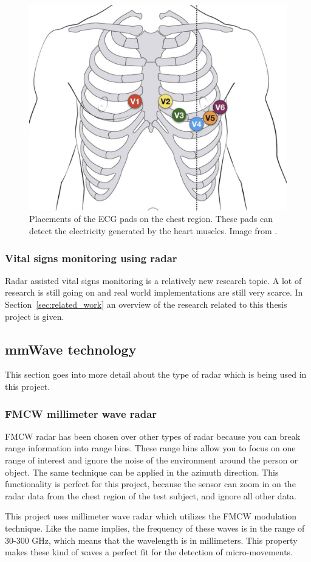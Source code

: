 \begin{figure}[t]
\centering
\includegraphics[width=.5\textwidth]{figures/background/ecg.png}
\caption{Placements of the ECG pads on the chest region. These pads can detect the electricity generated by the heart muscles. Image from \cite{ecg_lead_website}.}
\label{fig:ecg}
\end{figure}

\subsubsection{Vital signs monitoring using radar}
Radar assisted vital signs monitoring is a relatively new research topic. A lot of research is still going on and real world implementations are still very scarce. In Section~\ref{sec:related_work} an overview of the research related to this thesis project is given.  

\subsection{mmWave technology}
\label{sec:mmwave_tech}
This section goes into more detail about the type of radar which is being used in this project.

\subsubsection{FMCW millimeter wave radar}
FMCW radar has been chosen over other types of radar because you can break range information into range bins. These range bins allow you to focus on one range of interest and ignore the noise of the environment around the person or object. The same technique can be applied in the azimuth direction. This functionality is perfect for this project, because the sensor can zoom in on the radar data from the chest region of the test subject, and ignore all other data.

This project uses millimeter wave radar which utilizes the FMCW modulation technique. Like the name implies, the frequency of these waves is in the range of 30-300 GHz, which means that the wavelength is in millimeters. This property makes these kind of waves a perfect fit for the detection of micro-movements.

